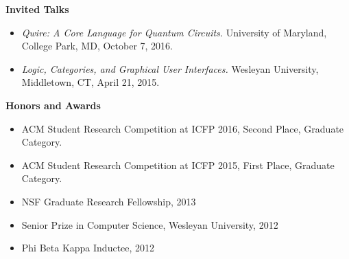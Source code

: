 \documentclass[letterpaper,11pt]{article}
\newcommand{\resitem}[1]{\item #1 \vspace{-2pt}}
\newcommand{\resheading}[1]{{\large \colorbox{mygrey}{\begin{minipage}{\textwidth}{\textbf{#1 \vphantom{p\^{E}}}}\end{minipage}}}}
\begin{document}
\resheading{Invited Talks}
    \begin{itemize}

    \item{\emph{Qwire: A Core Language for Quantum Circuits.}
        University of Maryland, College Park, MD, October 7, 2016.}


    \item{\emph{Logic, Categories, and Graphical User Interfaces.}
        Wesleyan University, Middletown, CT, April 21, 2015.}


    \end{itemize}

\resheading{Honors and Awards}
    \begin{itemize}
        \resitem{ACM Student Research Competition at ICFP 2016, Second Place, Graduate
          Category.}
        \resitem{ACM Student Research Competition at ICFP 2015, First Place, Graduate
          Category.}
        \resitem{NSF Graduate Research Fellowship, 2013}
        \resitem{Senior Prize in Computer Science, Wesleyan University, 2012}
        \resitem{Phi Beta Kappa Inductee, 2012}
    \end{itemize}
\end{document}
